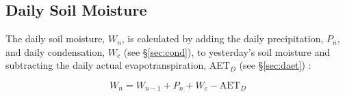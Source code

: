 \subsection{Daily Soil Moisture}
\label{sec:dw}
The daily soil moisture, $W_n$, is calculated by adding the daily precipitation, $P_n$, and daily condensation, $W_c$ (see \S \ref{sec:cond}), to yesterday's soil moisture and subtracting the daily actual evapotranspiration, AET$_D$ (see \S \ref{sec:daet}) \parencite{cramer88}:

\begin{equation}
\label{eq:dw}
	W_n = W_{n-1} + P_n + W_c - \text{AET}_D
\end{equation}

